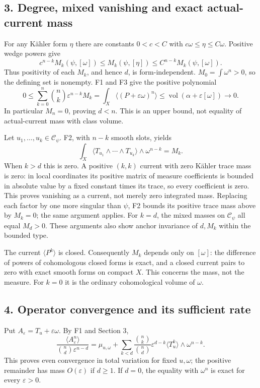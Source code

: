 \documentclass[
  10pt,
]{article}
\begin{document}
\subsection{3. Degree, mixed vanishing and exact actual-current
mass}\label{degree-mixed-vanishing-and-exact-actual-current-mass}

For any Kähler form \(\eta\) there are constants \(0<c<C\) with
\(c\omega\leq\eta\leq C\omega\). Positive wedge powers give \[
c^{n-k}M_k(\psi,[\omega])\leq M_k(\psi,[\eta])\leq C^{n-k}M_k(\psi,[\omega]).
\] Thus positivity of each \(M_k\), and hence \(d\), is
form-independent. \(M_0=\int\omega^n>0\), so the defining set is
nonempty. F1 and F3 give the positive polynomial \[
0\leq\sum_{k=0}^n\binom nk\varepsilon^{n-k}M_k
=\int_X\langle(P+\varepsilon\omega)^n\rangle
\leq\operatorname{vol}(\alpha+\varepsilon[\omega])\longrightarrow0.
\] In particular \(M_n=0\), proving \(d<n\). This is an upper bound, not
equality of actual-current mass with class volume.

Let \(u_1,\ldots,u_k\in\mathcal{C}_\psi\). F2, with \(n-k\) smooth slots,
yields \[
\int_X\langle T_{u_1}\wedge\cdots\wedge T_{u_k}\rangle\wedge\omega^{n-k}=M_k.
\] When \(k>d\) this is zero. A positive \((k,k)\) current with zero
Kähler trace mass is zero: in local coordinates its positive matrix of
measure coefficients is bounded in absolute value by a fixed constant
times its trace, so every coefficient is zero. This proves vanishing as
a current, not merely zero integrated mass. Replacing each factor by one
more singular than \(\psi\), F2 bounds its positive trace mass above by
\(M_k=0\); the same argument applies. For \(k=d\), the mixed masses on
\(\mathcal{C}_\psi\) all equal \(M_d>0\). These arguments also show
anchor invariance of \(d,M_k\) within the bounded type.

The current \(\langle P^k\rangle\) is closed. Consequently \(M_k\)
depends only on \([\omega]\): the difference of powers of cohomologous
closed forms is exact, and a closed current pairs to zero with exact
smooth forms on compact \(X\). This concerns the mass, not the measure.
For \(k=0\) it is the ordinary cohomological volume of \(\omega\).

\subsection{4. Operator convergence and its sufficient
rate}\label{operator-convergence-and-its-sufficient-rate}

Put \(A_\varepsilon=T_u+\varepsilon\omega\). By F1 and Section 3, \[
\frac{\langle A_\varepsilon^n\rangle}{\binom nd\varepsilon^{n-d}}
=\mu_{u,\omega}+\sum_{k<d}\frac{\binom nk}{\binom nd}\varepsilon^{d-k}
\langle T_u^k\rangle\wedge\omega^{n-k}.
\] This proves even convergence in total variation for fixed
\(u,\omega\); the positive remainder has mass \(O(\varepsilon)\) if
\(d\geq1\). If \(d=0\), the equality with \(\omega^n\) is exact for
every \(\varepsilon>0\).
\end{document}
